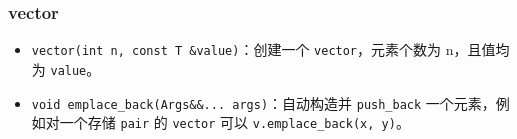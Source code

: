 \subsubsection{vector}
	\begin{itemize}
		\item \texttt{vector(int n, const T &value)}：创建一个 \texttt{vector}，元素个数为 n，且值均为 \texttt{value}。
		\item \texttt{void emplace_back(Args&&... args)}：自动构造并 \texttt{push_back} 一个元素，例如对一个存储 \texttt{pair} 的 \texttt{vector} 可以 \texttt{v.emplace_back(x, y)}。
	\end{itemize}

